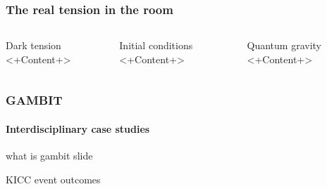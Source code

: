 \documentclass[aspectratio=169]{beamer}
\begin{document}
\begin{frame}
    \frametitle{The real tension in the room}

    \begin{columns}
        \begin{block}{Dark tension}
            <+Content+>
        \end{block}
        \begin{block}{Initial conditions}
            <+Content+>
        \end{block}
        \begin{block}{Quantum gravity}
            <+Content+>
        \end{block}
    \end{columns}

\end{frame}

\begin{frame}
    \frametitle{GAMBIT}
    \framesubtitle{Interdisciplinary case studies}
    what is gambit slide

    KICC event outcomes
\end{frame}
\end{document}

